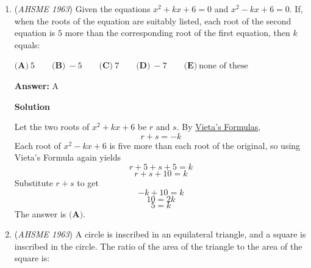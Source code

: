 \begin{enumerate}
 Assume $a,b \ge 0$, and WLOG, assume $c < 0$ and $c \le d$.  This also takes into account when $d$ is negative.  That means
 \[2^a + 2^b = \frac{1}{3^{-c}} + 3^d\]Multiply both sides by $3^{-c}$ to get
 \[3^{-c} (2^a + 2^b) = 1 + 3^{d-c}\]That makes both sides integers.  The left side is congruent to $0$ modulo $3$ while the right side is congruent to $1$ or $2$ modulo $3$, so equality can not happen.  Thus, $c$ and $d$ can not be negative when $a,b \ge 0$.

 Assume $a,c < 0$, and WLOG, let $a \le b$ and $c \le d$.  This also takes into account when $b$ or $d$ is negative.  That means
 \[\frac{1}{2^{-a}} + 2^b = \frac{1}{3^{-c}} + 3^d\]Multiply both sides by $2^{-a} \cdot 3^{-c}$ to get
 \[3^{-c} (1 + 2^{b-a}) = 2^{-a} (1 + 3^{d-c})\]That makes both sides integers.  The left side is congruent to $0$ modulo $3$ while the right side is congruent to $1$ or $2$ modulo $3$, so equality can not happen.  Thus, $a$ and $c$ can not be negative.

 Putting all the information together, none of $a,b,c,d$ can be negative, so the answer is $\boxed{\textbf{(E)}}$.

 


	\item (\textit{AHSME 1963}) Given the equations $x^2+kx+6=0$ and $x^2-kx+6=0$. If, when the roots of the equation are suitably listed, 
each root of the second equation is $5$ more than the corresponding root of the first equation, then $k$ equals:


 $\textbf{(A)}\ 5 \qquad \textbf{(B)}\ -5 \qquad \textbf{(C)}\ 7 \qquad \textbf{(D)}\ -7 \qquad \textbf{(E)}\ \text{none of these}$

 \textbf{Answer: }A



\textbf{Solution}

Let the two roots of $x^2 + kx + 6$ be $r$ and $s$.  By \href{https://artofproblemsolving.com/wiki/index.php?title=Vieta\%27s\_Formulas}{Vieta's Formulas},
 \[r+s=-k\]Each root of $x^2 - kx + 6$ is five more than each root of the original, so using Vieta's Formula again yields
 \[r+5+s+5 = k\]
 \[r+s+10=k\]Substitute $r+s$ to get
 \[-k + 10 = k\]
 \[10 = 2k\]
 \[5 = k\]The answer is $\boxed{\textbf{(A)}}$.

 


	\item (\textit{AHSME 1963}) A circle is inscribed in an equilateral triangle, and a square is inscribed in the circle. 
The ratio of the area of the triangle to the area of the square is:



\end{enumerate}
